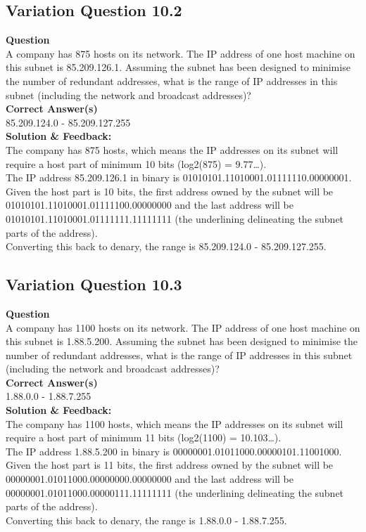 \subsection{Variation Question 10.2}

\textbf{Question}\\
A company has 875 hosts on its network. The IP address of one host 
machine on this subnet is 85.209.126.1. Assuming the subnet has been 
designed to minimise the number of redundant addresses, what is the 
range of IP addresses in this subnet (including the network and broadcast 
addresses)?\\
\textbf{Correct Answer(s)}\\
85.209.124.0 - 85.209.127.255\\
\textbf{Solution \& Feedback:}\\
The company has 875 hosts, which means the IP addresses on its subnet will require a 
host part of minimum 10 bits (log2(875) = 9.77…).\\
The IP address 85.209.126.1 in binary is 01010101.11010001.01111110.00000001.
Given the host part is 10 bits, the first address owned by the subnet will be 
01010101.11010001.01111100.00000000 and the last address will be 
01010101.11010001.01111111.11111111 (the underlining delineating the subnet parts 
of the address).\\
Converting this back to denary, the range is 85.209.124.0 - 85.209.127.255.

\subsection{Variation Question 10.3}

\textbf{Question}\\
A company has 1100 hosts on its network. The IP address of one host 
machine on this subnet is 1.88.5.200. Assuming the subnet has been 
designed to minimise the number of redundant addresses, what is the 
range of IP addresses in this subnet (including the network and broadcast 
addresses)?\\
\textbf{Correct Answer(s)}\\
1.88.0.0 - 1.88.7.255\\
\textbf{Solution \& Feedback:}\\
The company has 1100 hosts, which means the IP addresses on its subnet will require a 
host part of minimum 11 bits (log2(1100) = 10.103…).\\
The IP address 1.88.5.200 in binary is 00000001.01011000.00000101.11001000.
Given the host part is 11 bits, the first address owned by the subnet will be 
00000001.01011000.00000000.00000000 and the last address will be 
00000001.01011000.00000111.11111111 (the underlining delineating the subnet parts 
of the address).\\
Converting this back to denary, the range is 1.88.0.0 - 1.88.7.255.